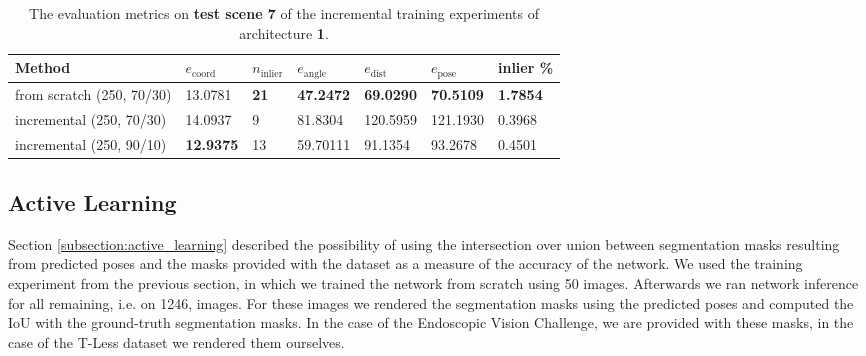\begin{table}[]
\centering
\begin{tabular}{|l||llllll|} \hline 
Method   & $e_{\text{coord}}$ & $n_{\text{inlier}}$ & $e_{\text{angle}}$ & $e_{\text{dist}}$ & $e_{\text{pose}}$  & inlier \% \\ \hline \hline  \rowcolor{Gray}
from scratch (250, 70/30)       & 13.0781             & \textbf{21}                 & \textbf{47.2472}  &\textbf{69.0290}          & \textbf{70.5109}            & \textbf{1.7854}            \\ 
incremental (250, 70/30) & 14.0937             & 9                  & 81.8304             & 120.5959           & 121.1930 & 0.3968         \\  \rowcolor{Gray}
incremental (250, 90/10) & \textbf{12.9375}             & 13                 & 59.70111            & 91.1354            & 93.2678   & 0.4501      \\ \hline 
\end{tabular}
\caption{The evaluation metrics on \textbf{test scene 7} of the incremental training experiments of architecture \textbf{1}.}
\label{table:experiments_online_scratch_arch1_test_set}
\end{table}

\subsection{Active Learning} \label{subsection:experiments_active_learning}

Section \ref{subsection:active_learning} described the possibility of using the intersection over union between segmentation masks resulting from predicted poses and the masks provided with the dataset as a measure of the accuracy of the network. We used the training experiment from the previous section, in which we trained the network from scratch using 50 images. Afterwards we ran network inference for all remaining, i.e. on 1246, images. For these images we rendered the segmentation masks using the predicted poses and computed the IoU with the ground-truth segmentation masks. In the case of the Endoscopic Vision Challenge, we are provided with these masks, in the case of the T-Less dataset we rendered them ourselves. 


